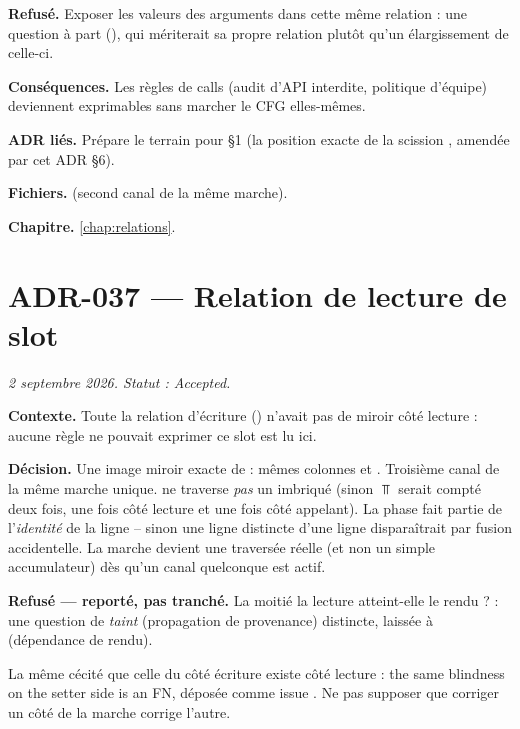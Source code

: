 \textbf{Refusé.} Exposer les valeurs des arguments dans cette même relation :
une question à part (), qui mériterait sa propre relation plutôt
qu'un élargissement de celle-ci.

\textbf{Conséquences.} Les règles de \og calls\fg{} (audit d'API interdite,
politique d'équipe) deviennent exprimables sans marcher le CFG elles-mêmes.

\textbf{ADR liés.} Prépare le terrain pour  §1 (la position exacte de
la scission , amendée par cet ADR §6).

\textbf{Fichiers.}  (second canal de la même
marche).

\textbf{Chapitre.} \cref{chap:relations}.

\section{ADR-037 --- Relation de lecture de slot}
\label{adr:37}
\noindent\textit{2 septembre 2026. Statut : Accepted.}

\textbf{Contexte.} Toute la relation d'écriture ()
n'avait pas de miroir côté lecture : aucune règle ne pouvait exprimer
\og ce slot est lu ici\fg{}.

\textbf{Décision.} Une image miroir exacte de  :
mêmes colonnes  et . Troisième canal de la même
marche unique.  ne traverse \emph{pas} un 
imbriqué (sinon $\Top$ serait compté deux fois, une fois côté lecture et une
fois côté appelant). La phase fait partie de l'\emph{identité} de la ligne --
sinon une ligne  distincte d'une ligne 
disparaîtrait par fusion accidentelle. La marche devient une traversée
\og réelle\fg{} (et non un simple accumulateur) dès qu'un canal quelconque
est actif.

\textbf{Refusé --- reporté, pas tranché.} La moitié \og la lecture
atteint-elle le rendu ?\fg{} : une question de \emph{taint} (propagation de
provenance) distincte, laissée à  (dépendance de rendu).

\begin{piege}
La même cécité que celle du côté écriture existe côté lecture : \og the same
blindness on the setter side is an FN\fg{}, déposée comme issue .
Ne pas supposer que corriger un côté de la marche corrige l'autre.
\end{piege}

